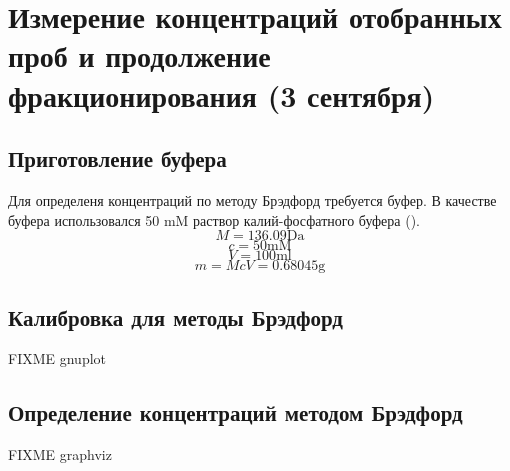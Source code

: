 \section{Измерение концентраций отобранных проб и продолжение фракционирования (3 сентября)}
\subsection{Приготовление буфера}
Для определеня концентраций по методу Брэдфорд требуется буфер.
В качестве буфера использовался 50 mM раствор калий-фосфатного буфера ().
$$ M = 136.09 \text{Da} $$
$$ c = 50 \text{mM} $$
$$ V = 100 \text{ml} $$
$$ m = McV = 0.68045 \text{g} $$

\subsection{Калибровка для методы Брэдфорд}

FIXME gnuplot

\subsection{Определение концентраций методом Брэдфорд}

FIXME graphviz



